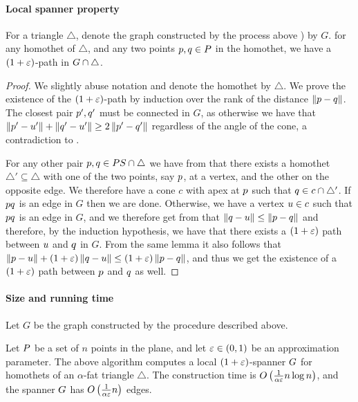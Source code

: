 \documentclass[12pt]{article}%
\begin{document}
\paragraph{Local spanner property}
\begin{lemma}
    For a triangle $\triangle$, denote the graph constructed by the
    process above ) by $G$. for any homothet
    of $\triangle$, and any two points $p, q \in P$ in the
    homothet, we have a $(1+\varepsilon)$-path in
    $G \cap {\triangle}$.
\end{lemma}



\begin{proof}
    We slightly abuse notation and denote the homothet by
    $\triangle$. We prove the existence of the $(1+\varepsilon)$-path by
    induction over the rank of the distance $\left\| p - q \right\|$. The
    closest pair $p',q'$ must be connected in $G$, as otherwise we
    have that $\left\| p' - u' \right\|+\left\| q' - u' \right\|\geq 2 \left\| p' - q' \right\|$
    regardless of the angle of the cone, a contradiction to
    .

    For any other pair $p,q\in PS\cap \triangle$ we have from
     that there exists a homothet
    $\triangle'\subseteq \triangle$ with one of the two points, say
    $p$, at a vertex, and the other on the opposite edge. We
    therefore have a cone $c$ with apex at $p$ such that
    $q\in c\cap \triangle'$. If $pq$ is an edge in $G$ then we
    are done. Otherwise, we have a vertex $u\in c$ such that
    $pq$ is an edge in $G$, and we therefore get from
     that
    $\left\| q - u \right\|\leq \left\| p - q \right\|$ and therefore, by the induction
    hypothesis, we have that there exists a $(1+\varepsilon)$ path between
    $u$ and $q$ in $G$. From the same lemma it also follows that
    $\left\| p - u \right\|+(1+\varepsilon)\left\| q - u \right\|\leq(1+\varepsilon)\left\| p - q \right\|$,
    and thus we get the existence of a $(1+\varepsilon)$ path between $p$
    and $q$ as well.

\end{proof}


\paragraph{Size and running time}
Let $G$ be the graph constructed by the procedure described above.


\begin{theorem}
    Let $P$ be a set of $n$ points in the plane, and let
    $\varepsilon \in (0,1)$ be an approximation parameter. The above
    algorithm computes a local $(1+\varepsilon)$-spanner $G$ for homothets
    of an $\alpha$-fat triangle $\triangle$.  The construction time is
    $O\left(\frac{1}{\alpha\varepsilon}n\log n\right)$, and the spanner $G$
    has $O\left(\frac{1}{\alpha\varepsilon}n\right)$ edges.
\end{theorem}
\end{document}
